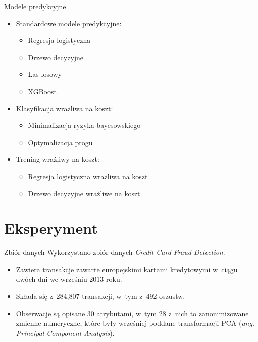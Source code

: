 \documentclass{beamer}
\begin{document}
\begin{frame}{Modele predykcyjne}
	\begin{itemize}
		\item Standardowe modele predykcyjne:
		\begin{itemize}
			\item Regresja logistyczna
			\item Drzewo decyzyjne
			\item Las losowy
			\item XGBoost
		\end{itemize}
		\item Klasyfikacja wrażliwa na koszt:
		\begin{itemize}
			\item Minimalizacja ryzyka bayesowskiego
			\item Optymalizacja progu
		\end{itemize}
		\item Trening wrażliwy na koszt:
		\begin{itemize}
			\item Regresja logistyczna wrażliwa na koszt
			\item Drzewo decyzyjne wrażliwe na koszt
		\end{itemize}
	\end{itemize}
\end{frame}

\section{Eksperyment}

\begin{frame}{Zbiór danych}
	Wykorzystano zbiór danych \emph{Credit Card Fraud Detection}.
	\begin{itemize}
		\item Zawiera transakcje zawarte europejskimi kartami kredytowymi w~ciągu dwóch dni we wrześniu 2013 roku.
		\item Składa się z~284,807 transakcji, w~tym z~492 oszustw.
		\item Obserwacje są opisane 30 atrybutami, w~tym 28 z~nich to zanonimizowane zmienne numeryczne, które były wcześniej poddane transformacji PCA (\textit{ang. Principal Component Analysis}).
	\end{itemize}
\end{frame}
\end{document}
